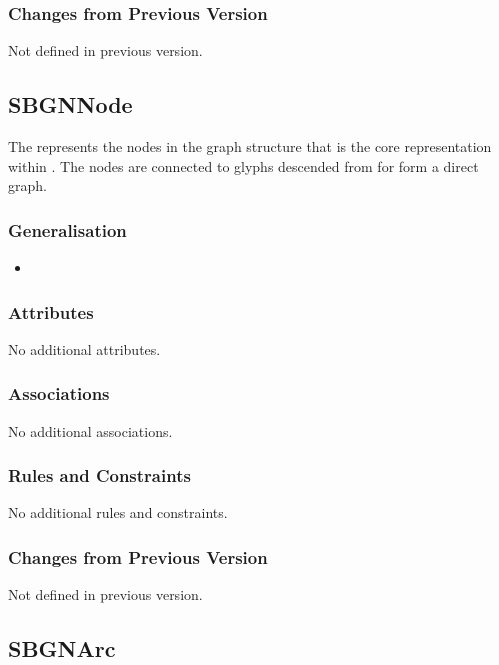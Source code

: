 \subsubsection{Changes from Previous Version}

Not defined in previous version.


\subsection{SBGNNode}

The  represents the nodes in the graph structure
that is the core representation within \PDl. The nodes are connected
to glyphs descended from  for form a direct graph.

\subsubsection{Generalisation}

\begin{itemize}
\item {}
\end{itemize}

\subsubsection{Attributes}

No additional attributes.

\subsubsection{Associations}

No additional associations.

\subsubsection{Rules and Constraints}

No additional rules and constraints.

\subsubsection{Changes from Previous Version}

Not defined in previous version.

\subsection{SBGNArc}

